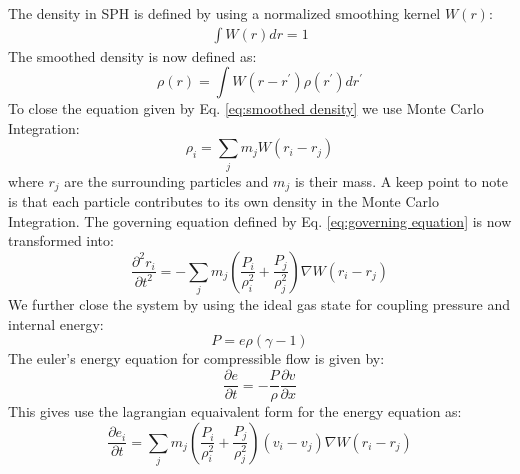 \documentclass[11pt]{article}
\begin{document}
The density in SPH is defined by using a normalized smoothing kernel $W(r)$:
\begin{align}
  \int W(r) dr = 1
\end{align}
The smoothed density is now defined as:
\begin{equation}
  \rho(r) = \int W (r - r^\prime)\rho (r^\prime)dr^\prime
  \label{eq:smoothed density}
\end{equation}
To close the equation given by Eq. \ref{eq:smoothed density} we use Monte Carlo Integration:
\begin{equation}
  \rho_i = \sum_{j} m_j W (r_i -r_j)
  \label{eq:monte carlo integration}
\end{equation}
where $r_j$ are the surrounding particles and $m_j$ is their mass. A keep point to note is that each particle contributes to its own density in the Monte Carlo Integration.
The governing equation defined by Eq. \ref{eq:governing equation} is now transformed into:
\begin{equation}
  \frac{\partial ^2 r_i}{\partial t^2} = -\sum_{j} m_j\left(\frac{P_i}{\rho_i ^2} + \frac{P_j}{\rho_j ^2}\right)\nabla W \left(r_i-r_j\right)
  \label{eq:Discretized equation}
\end{equation}
We further close the system by using the ideal gas state for coupling pressure and internal energy:
\begin{equation}
    P = e\rho (\gamma -1)
    \label{eq:ideal gas state}
\end{equation}
The euler's energy equation for compressible flow is given by:
\begin{equation}
  \frac{\partial e}{\partial t} = -\displaystyle\frac{P}{\rho} \frac{\partial v}{\partial x}
    \label{eq:energy equation}
\end{equation}  
This gives use the lagrangian equaivalent form for the energy equation as:
\begin{equation}
 \frac{\partial  e_i}{\partial t} = \sum_{j} m_j \left(\frac{P_i}{\rho_i ^2} + \frac{P_j}{\rho_j ^2}\right) \left(v_i - v_j\right)\nabla W \left(r_i-r_j\right)
    \label{eq:lagrangian energy equation}
\end{equation}
\end{document}
